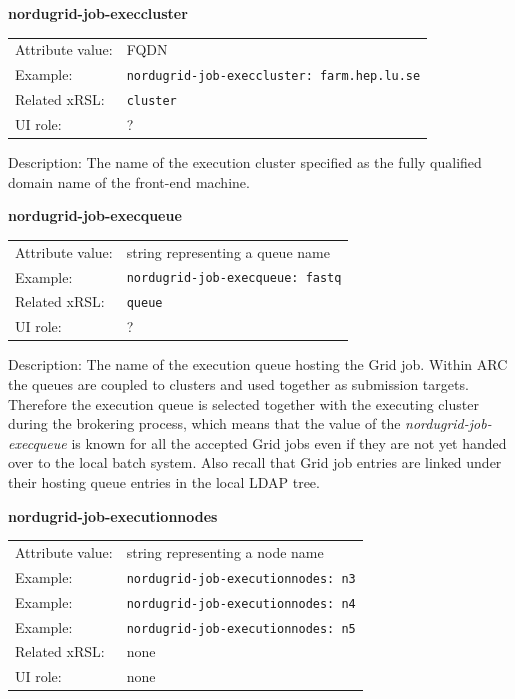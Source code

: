 \documentclass{article}
\begin{document}
  \hspace*{0.5cm}
  \begin{shaded}
    \textbf{nordugrid-job-execcluster}
  \end{shaded}
  \begin{tabular}{lp{10cm}}  
    Attribute value:& FQDN\\
    Example:& \verb#nordugrid-job-execcluster: farm.hep.lu.se#\\
    Related xRSL:& \verb#cluster#\\
    UI role:& ?\\
  \end{tabular}

Description:  The name of the execution cluster specified as the fully 
qualified domain name of the front-end machine.


  \hspace*{0.5cm}
  \begin{shaded}
    \textbf{nordugrid-job-execqueue}
  \end{shaded}
  \begin{tabular}{lp{10cm}}  
    Attribute value:& string representing a queue name\\
    Example:& \verb#nordugrid-job-execqueue: fastq#\\
    Related xRSL:&  \verb#queue#\\
    UI role:& ?\\    
  \end{tabular}

Description: The name of the execution queue hosting the Grid job.
Within ARC the queues are coupled to clusters and used together as 
submission targets. Therefore the execution queue is
selected together with the executing cluster during the brokering process, which means
that the value of the {\it nordugrid-job-execqueue} is known for all the accepted Grid jobs
even if they are not yet handed over to the local batch system.
Also recall that Grid job entries are linked under their hosting queue entries in the 
local LDAP tree. 


  \hspace*{0.5cm}
  \begin{shaded}
    \textbf{nordugrid-job-executionnodes}
  \end{shaded}
  \begin{tabular}{lp{10cm}}  
    Attribute value:& string representing a node name\\
    Example:& \verb#nordugrid-job-executionnodes: n3#\\
    Example:& \verb#nordugrid-job-executionnodes: n4#\\
    Example:& \verb#nordugrid-job-executionnodes: n5#\\
    Related xRSL:& none\\
    UI role:& none\\
  \end{tabular}
\end{document}
